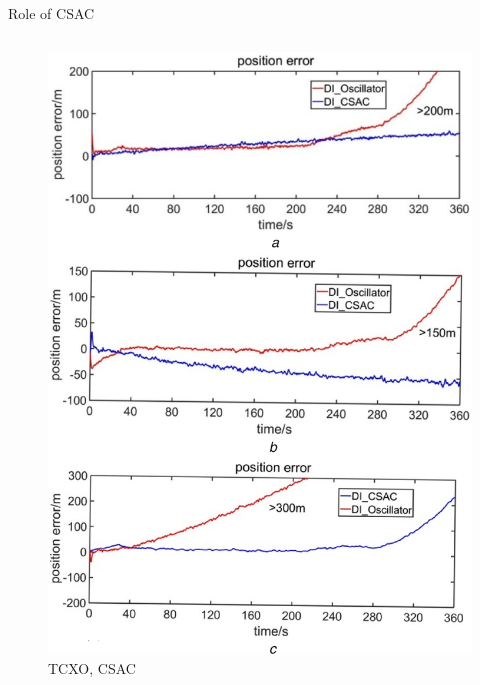 \begin{frame}{Role of CSAC}
\begin{columns}[c, onlytextwidth]
\begin{column}{0.40\textwidth}
            \begin{figure}
                \centering
                \includegraphics[width=\textwidth]{img/GNSS-errors.jpg}
                \caption{
                    \textcolor[HTML]{3E4091}{TCXO},
                    \textcolor[HTML]{B04A47}{CSAC}
                }
            \end{figure}

        \end{column}

    \end{columns}

\end{frame}

